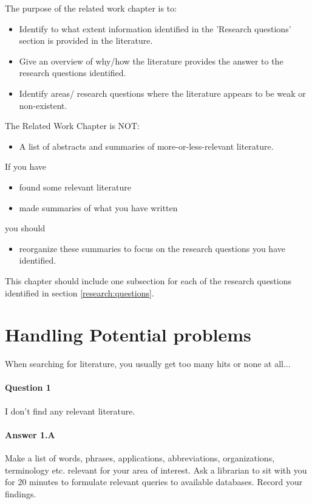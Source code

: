 The purpose of the related work chapter is to:
\begin{itemize}
\item Identify to what extent information identified in the 'Research questions'  section is provided in the literature.
\item Give an overview of why/how the literature provides the answer to the research questions identified.
\item Identify areas/ research questions where the literature appears to be weak or non-existent.
\end{itemize}
The Related Work Chapter is NOT:
\begin{itemize}
\item   A list of abstracts and summaries of more-or-less-relevant literature.
\end{itemize}
If you have
\begin{itemize}
\item   found some relevant literature
\item   made summaries of what you have written
\end{itemize}
you should
\begin{itemize}
\item reorganize these summaries to focus on the research questions you have identified.
\end{itemize}

This chapter should include one subsection for each of the research
questions identified in section \ref{research:questions}.  



\section{Handling Potential problems}
When searching for literature, you usually get too many hits or none at all...

\paragraph{Question 1} I don't find any relevant literature.

\paragraph{Answer 1.A}  Make a list of words, phrases, applications, abbreviations,
organizations, terminology etc. relevant for your area of interest.
Ask a librarian to sit with you for 20 minutes to formulate relevant
queries to available databases.  Record your findings.


